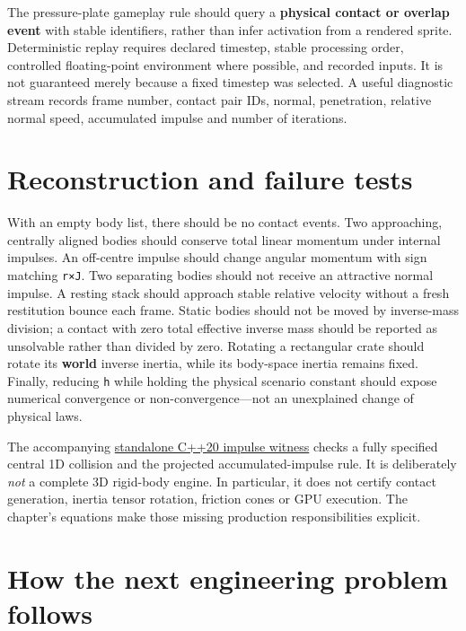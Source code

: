 The pressure-plate gameplay rule should query a \textbf{physical contact or overlap event} with stable identifiers, rather than infer activation from a rendered sprite. Deterministic replay requires declared timestep, stable processing order, controlled floating-point environment where possible, and recorded inputs. It is not guaranteed merely because a fixed timestep was selected. A useful diagnostic stream records frame number, contact pair IDs, normal, penetration, relative normal speed, accumulated impulse and number of iterations.

\section{Reconstruction and failure tests}\label{02-foundations-ii-ch039-reconstruction-and-failure-tests}

With an empty body list, there should be no contact events. Two approaching, centrally aligned bodies should conserve total linear momentum under internal impulses. An off-centre impulse should change angular momentum with sign matching \texttt{r×J}. Two separating bodies should not receive an attractive normal impulse. A resting stack should approach stable relative velocity without a fresh restitution bounce each frame. Static bodies should not be moved by inverse-mass division; a contact with zero total effective inverse mass should be reported as unsolvable rather than divided by zero. Rotating a rectangular crate should rotate its \textbf{world} inverse inertia, while its body-space inertia remains fixed. Finally, reducing \texttt{h} while holding the physical scenario constant should expose numerical convergence or non-convergence---not an unexplained change of physical laws.

The accompanying \hyperref[source-file-128143bcbfc7213e97eaefa4]{standalone C++20 impulse witness} checks a fully specified central 1D collision and the projected accumulated-impulse rule. It is deliberately \emph{not} a complete 3D rigid-body engine. In particular, it does not certify contact generation, inertia tensor rotation, friction cones or GPU execution. The chapter's equations make those missing production responsibilities explicit.

\section{How the next engineering problem follows}\label{02-foundations-ii-ch039-how-the-next-engineering-problem-follows}

